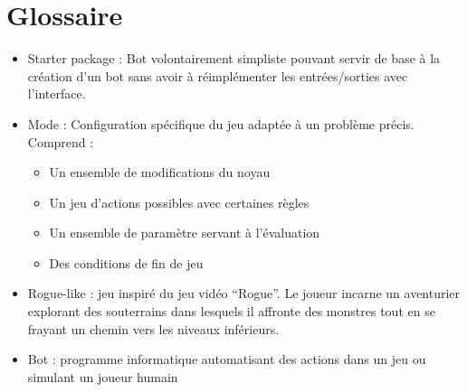 \documentclass[12pt]{article}
\begin{document}
\section{Glossaire}

\begin{itemize}
\item
  Starter package : Bot volontairement simpliste pouvant servir de base
  à la création d'un bot sans avoir à réimplémenter les entrées/sorties
  avec l'interface.
\item
  Mode : Configuration spécifique du jeu adaptée à un problème précis.
  Comprend :

  \begin{itemize}
  \item
    Un ensemble de modifications du noyau
  \item
    Un jeu d'actions possibles avec certaines règles
  \item
    Un ensemble de paramètre servant à l'évaluation
  \item
    Des conditions de fin de jeu
  \end{itemize}
\item
  Rogue-like : jeu inspiré du jeu vidéo ``Rogue''. Le joueur incarne un
  aventurier explorant des souterrains dans lesquels il affronte des
  monstres tout en se frayant un chemin vers les niveaux inférieurs.
\item
  Bot : programme informatique automatisant des actions dans un jeu ou
  simulant un joueur humain
\end{itemize}
\end{document}
